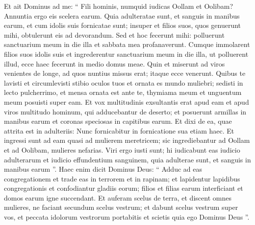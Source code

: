 \begin{biblechapter}
\begin{biblechapter}
\begin{biblechapter}
\begin{biblechapter}
\begin{biblechapter}
\begin{biblechapter}
\begin{biblechapter}
\begin{biblechapter}
\begin{biblechapter}
\begin{biblechapter}
\begin{biblechapter}
\begin{biblechapter}
\begin{biblechapter}
\begin{biblechapter}
\begin{biblechapter}
\begin{biblechapter}
\begin{biblechapter}
\begin{biblechapter}
\begin{biblechapter}
\begin{biblechapter}
\begin{biblechapter}
\begin{biblechapter}
\begin{biblechapter}
\verse Et ait Dominus ad me: “ Fili hominis, numquid iudicas Oollam et Oolibam? Annuntia ergo eis scelera earum. 
\verse Quia adulteratae sunt, et sanguis in manibus earum, et cum idolis suis fornicatae sunt; insuper et filios suos, quos genuerunt mihi, obtulerunt eis ad devorandum. 
\verse Sed et hoc fecerunt mihi: polluerunt sanctuarium meum in die illa et sabbata mea profanaverunt. 
\verse Cumque immolarent filios suos idolis suis et ingrederentur sanctuarium meum in die illa, ut polluerent illud, ecce haec fecerunt in medio domus meae. 
\verse Quin et miserunt ad viros venientes de longe, ad quos nuntius missus erat; itaque ecce venerunt. Quibus te lavisti et circumlevisti stibio oculos tuos et ornata es mundo muliebri; 
\verse sedisti in lecto pulcherrimo, et mensa ornata est ante te, thymiama meum et unguentum meum posuisti super eam. 
\verse Et vox multitudinis exsultantis erat apud eam et apud viros multitudo hominum, qui adducebantur de deserto; et posuerunt armillas in manibus earum et coronas speciosas in capitibus earum. 
\verse Et dixi de ea, quae attrita est in adulteriis: Nunc fornicabitur in fornicatione sua etiam haec. 
\verse Et ingressi sunt ad eam quasi ad mulierem meretricem; sic ingrediebantur ad Oollam et ad Oolibam, mulieres nefarias. 
\verse Viri ergo iusti sunt; hi iudicabunt eas iudicio adulterarum et iudicio effundentium sanguinem, quia adulterae sunt, et sanguis in manibus earum ”.
 \verse Haec enim dicit Dominus Deus: “ Adduc ad eas congregationem et trade eas in terrorem et in rapinam; 
\verse et lapidentur lapidibus congregationis et confodiantur gladiis eorum; filios et filias earum interficiant et domos earum igne succendant. 
\verse Et auferam scelus de terra, et discent omnes mulieres, ne faciant secundum scelus vestrum; 
\verse et dabunt scelus vestrum super vos, et peccata idolorum vestrorum portabitis et scietis quia ego Dominus Deus ”.
 

\end{biblechapter}
\end{biblechapter}
\end{biblechapter}
\end{biblechapter}
\end{biblechapter}
\end{biblechapter}
\end{biblechapter}
\end{biblechapter}
\end{biblechapter}
\end{biblechapter}
\end{biblechapter}
\end{biblechapter}
\end{biblechapter}
\end{biblechapter}
\end{biblechapter}
\end{biblechapter}
\end{biblechapter}
\end{biblechapter}
\end{biblechapter}
\end{biblechapter}
\end{biblechapter}
\end{biblechapter}
\end{biblechapter}
